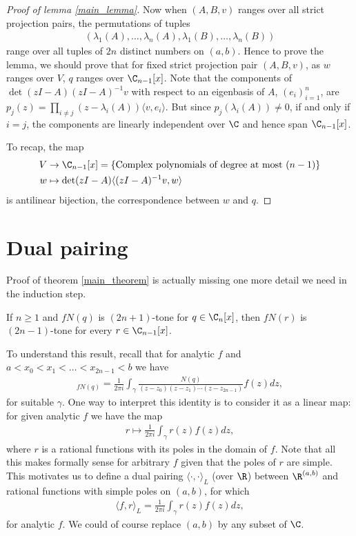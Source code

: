 \begin{proof}[Proof of lemma \ref{main_lemma}]
	Now when $(A, B, v)$ ranges over all strict projection pairs, the permutations of tuples
	\begin{align}
	(\lambda_{1}(A), \ldots, \lambda_{n}(A), \lambda_{1}(B), \ldots, \lambda_{n}(B))
	\end{align}
	range over all tuples of $2 n$ distinct numbers on $(a, b)$. Hence to prove the lemma, we should prove that for fixed strict projection pair $(A, B, v)$, as $w$ ranges over $V$, $q$ ranges over $\C_{n - 1}[x]$. Note that the components of $\det(z I - A)(z I - A)^{-1} v$ with respect to an eigenbasis of $A$, $(e_{i})_{i = 1}^{n}$, are $p_{j}(z) = \prod_{i \neq j}(z - \lambda_{i}(A)) \langle v, e_{i} \rangle$. But since $p_{j}(\lambda_{i}(A)) \neq 0$, if and only if $i = j$, the components are linearly independent over $\C$ and hence span $\C_{n - 1}[x]$.

	To recap, the map
	\begin{align*}
		V &\to \C_{n - 1}[x] = \{\text{Complex polynomials of degree at most } (n - 1) \} \\
		w &\mapsto \det(z I - A) \langle (z I - A)^{-1} v, w \rangle
	\end{align*}
	is antilinear bijection, the correspondence between $w$ and $q$.
\end{proof}

\section{Dual pairing}

Proof of theorem \ref{main_theorem} is actually missing one more detail we need in the induction step.

\begin{lem}\label{k_tone_cor}
	If $n \geq 1$ and $f N(q)$ is $(2 n + 1)$-tone for $q \in \C_{n}[x]$, then $f N(r)$ is $(2 n - 1)$-tone for every $r \in \C_{n - 1}[x]$.
\end{lem}

To understand this result, recall that for analytic $f$ and $a < x_{0} < x_{1} < \ldots < x_{2 n - 1} < b$ we have
\begin{align*}
	[x_{0}, x_{1}, \ldots, x_{2 n - 1}]_{f N(q)} = \frac{1}{2 \pi i} \int_{\gamma} \frac{N(q)}{(z - z_{0}) (z - z_{1}) \cdots (z - z_{2 n - 1})} f(z) dz,
\end{align*}
for suitable $\gamma$. One way to interpret this identity is to consider it as a linear map: for given analytic $f$ we have the map
\begin{align*}
	r \mapsto  \frac{1}{2 \pi i} \int_{\gamma} r(z) f(z) dz,
\end{align*}
where $r$ is a rational functions with its poles in the domain of $f$. Note that all this makes formally sense for arbitrary $f$ given that the poles of $r$ are simple. This motivates us to define a dual pairing $\langle \cdot, \cdot \rangle_{L}$ (over $\R$) between $\R^{(a, b)}$ and rational functions with simple poles on $(a, b)$, for which
\begin{align*}
	\langle f, r \rangle_{L} = \frac{1}{2 \pi i} \int_{\gamma} r(z) f(z) dz,
\end{align*}
for analytic $f$. We could of course replace $(a, b)$ by any subset of $\C$.


